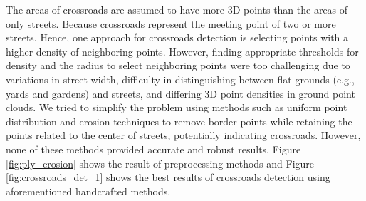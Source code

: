 \documentclass[11pt]{article}
\begin{document}
    The areas of crossroads are assumed to have more 3D points than the areas of only streets. Because crossroads represent
    the meeting point of two or more streets. Hence, one approach for crossroads detection is selecting points with
    a higher density of neighboring points. However, finding appropriate thresholds for density and the radius to
    select neighboring points were too challenging due to variations in street width, difficulty in distinguishing
    between flat grounds (e.g., yards and gardens) and streets, and differing 3D point densities in ground point
    clouds. We tried to simplify the problem using methods such as uniform point distribution and erosion techniques
    to remove border points while retaining the points related to the center of streets, potentially indicating
    crossroads. However, none of these methods provided accurate and robust results. Figure \ref{fig:ply_erosion} shows the
    result of preprocessing methods and Figure \ref{fig:crossroads_det_1} shows the best results of crossroads detection using
    aforementioned handcrafted methods.
\end{document}
